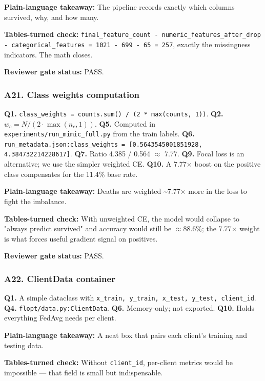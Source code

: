 \documentclass{article}
\begin{document}
\textbf{Plain-language takeaway:} The pipeline records exactly which columns survived, why, and how many.


\textbf{Tables-turned check:} \texttt{final\_feature\_count - numeric\_features\_after\_drop - categorical\_features = 1021 - 699 - 65 = 257}, exactly the missingness indicators. The math closes.


\textbf{Reviewer gate status:} PASS.


\subsubsection{A21. Class weights computation}


\textbf{Q1.} \texttt{class\_weights = counts.sum() / (2 * max(counts, 1))}. \textbf{Q2.} \(w_c = N / (2 \cdot \max(n_c, 1))\). \textbf{Q5.} Computed in \texttt{experiments/run\_mimic\_full.py} from the train labels. \textbf{Q6.} \texttt{run\_metadata.json:class\_weights = [0.5643545001851928, 4.384732214228617]}. \textbf{Q7.} Ratio 4.385 / 0.564 \ensuremath{\approx} 7.77. \textbf{Q9.} Focal loss is an alternative; we use the simpler weighted CE. \textbf{Q10.} A 7.77\ensuremath{\times} boost on the positive class compensates for the 11.4\% base rate.


\textbf{Plain-language takeaway:} Deaths are weighted \textasciitilde{}7.77\ensuremath{\times} more in the loss to fight the imbalance.


\textbf{Tables-turned check:} With unweighted CE, the model would collapse to "always predict survived" and accuracy would still be \ensuremath{\approx}88.6\%; the 7.77\ensuremath{\times} weight is what forces useful gradient signal on positives.


\textbf{Reviewer gate status:} PASS.


\subsubsection{A22. ClientData container}


\textbf{Q1.} A simple dataclass with \texttt{x\_train, y\_train, x\_test, y\_test, client\_id}. \textbf{Q4.} \texttt{flopt/data.py:ClientData}. \textbf{Q6.} Memory-only; not exported. \textbf{Q10.} Holds everything FedAvg needs per client.


\textbf{Plain-language takeaway:} A neat box that pairs each client's training and testing data.


\textbf{Tables-turned check:} Without \texttt{client\_id}, per-client metrics would be impossible --- that field is small but indispensable.
\end{document}
